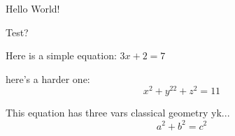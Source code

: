 \documentclass{article}
\begin{document}
    Hello World! 

    Test?

    Here is a simple equation: $3x+2=7$

    here's a harder one:
    $$x^2 + y^{22} + z^2 = 11$$


    

    This equation has three vars classical geometry yk...
    $$ a^2 + b^2 = c^2$$
\end{document}
